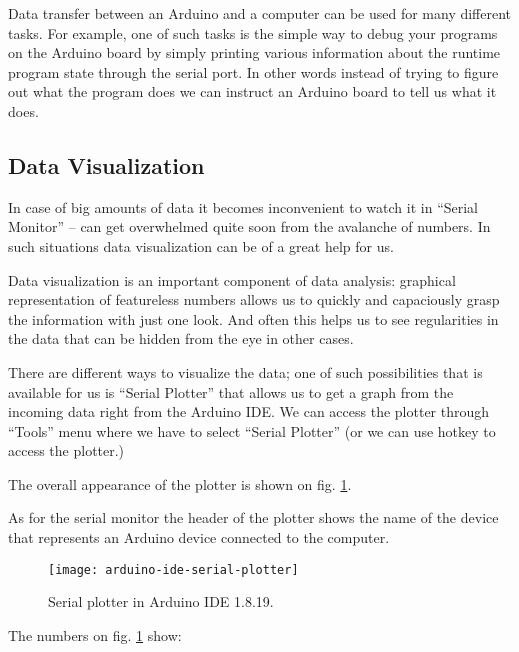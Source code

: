 \documentclass[../sparc.tex]{subfiles}
\begin{document}
Data transfer between an Arduino and a computer can be used for many different
tasks.  For example, one of such tasks is the simple way to debug your programs
on the Arduino board by simply printing various information about the runtime
program state through the serial port.  In other words instead of trying to
figure out what the program does we can instruct an Arduino board to tell us
what it does.

\subsection{Data Visualization}

In case of big amounts of data it becomes inconvenient to watch it in ``Serial
Monitor'' -- can get overwhelmed quite soon from the avalanche of numbers.  In
such situations data visualization can be of a great help for us.

Data visualization is an important component of data analysis: graphical
representation of featureless numbers allows us to quickly and capaciously grasp
the information with just one look.  And often this helps us to see regularities
in the data that can be hidden from the eye in other cases.

There are different ways to visualize the data; one of such possibilities that
is available for us is ``Serial Plotter'' that allows us to get a graph from the
incoming data right from the Arduino IDE.  We can access the plotter through
``Tools'' menu where we have to select ``Serial Plotter'' (or we can use
 hotkey to access the plotter.)

The overall appearance of the plotter is shown on
fig. \ref{fig:arduino-ide-serial-plotter}.

As for the serial monitor the header of the plotter shows the name of the device
that represents an Arduino device connected to the computer.

\begin{figure}[ht]
  \centering
  \texttt{[image: arduino-ide-serial-plotter]}
  \caption{Serial plotter in Arduino IDE 1.8.19.}
  \label{fig:arduino-ide-serial-plotter}
\end{figure}

The numbers on fig. \ref{fig:arduino-ide-serial-plotter} show:
\end{document}
